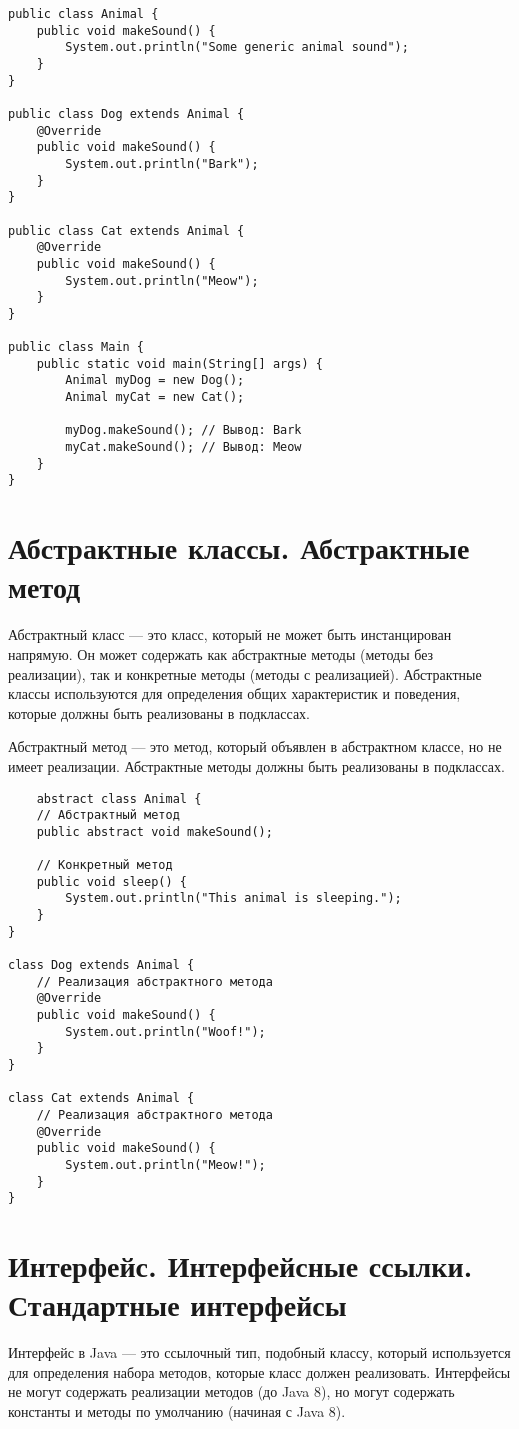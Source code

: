 \documentclass[12pt, a4paper]{article}
\begin{document}
\begin{verbatim}
public class Animal {
    public void makeSound() {
        System.out.println("Some generic animal sound");
    }
}

public class Dog extends Animal {
    @Override
    public void makeSound() {
        System.out.println("Bark");
    }
}

public class Cat extends Animal {
    @Override
    public void makeSound() {
        System.out.println("Meow");
    }
}

public class Main {
    public static void main(String[] args) {
        Animal myDog = new Dog();
        Animal myCat = new Cat();

        myDog.makeSound(); // Вывод: Bark
        myCat.makeSound(); // Вывод: Meow
    }
}
\end{verbatim}


\section{Абстрактные классы. Абстрактные метод}
Абстрактный класс — это класс, который не может быть инстанцирован напрямую. Он может содержать как абстрактные методы (методы без реализации), так и конкретные методы (методы с реализацией). Абстрактные классы используются для определения общих характеристик и поведения, которые должны быть реализованы в подклассах.

Абстрактный метод — это метод, который объявлен в абстрактном классе, но не имеет реализации. Абстрактные методы должны быть реализованы в подклассах.

\begin{verbatim}
    abstract class Animal {
    // Абстрактный метод
    public abstract void makeSound();

    // Конкретный метод
    public void sleep() {
        System.out.println("This animal is sleeping.");
    }
}

class Dog extends Animal {
    // Реализация абстрактного метода
    @Override
    public void makeSound() {
        System.out.println("Woof!");
    }
}

class Cat extends Animal {
    // Реализация абстрактного метода
    @Override
    public void makeSound() {
        System.out.println("Meow!");
    }
}

\end{verbatim}


\section{Интерфейс. Интерфейсные ссылки. Стандартные интерфейсы}
Интерфейс в Java — это ссылочный тип, подобный классу, который используется для определения набора методов, которые класс должен реализовать. Интерфейсы не могут содержать реализации методов (до Java 8), но могут содержать константы и методы по умолчанию (начиная с Java 8).
\end{document}
